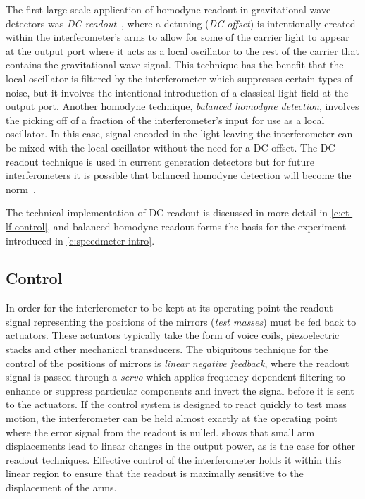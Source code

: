The first large scale application of homodyne readout in gravitational wave detectors was \emph{\gls{DC} readout}~\cite{Fricke2012}, where a detuning (\emph{\gls{DC} offset}) is intentionally created within the interferometer's arms to allow for some of the carrier light to appear at the output port where it acts as a local oscillator to the rest of the carrier that contains the gravitational wave signal. This technique has the benefit that the local oscillator is filtered by the interferometer which suppresses certain types of noise, but it involves the intentional introduction of a classical light field at the output port. Another homodyne technique, \emph{balanced homodyne detection}, involves the picking off of a fraction of the interferometer's input for use as a local oscillator. In this case, signal encoded in the light leaving the interferometer can be mixed with the local oscillator without the need for a \gls{DC} offset. The \gls{DC} readout technique is used in current generation detectors but for future interferometers it is possible that balanced homodyne detection will become the norm~\cite{Gard2016}.

The technical implementation of \gls{DC} readout is discussed in more detail in \cref{c:et-lf-control}, and balanced homodyne readout forms the basis for the experiment introduced in \cref{c:speedmeter-intro}.

\subsection{Control}
In order for the interferometer to be kept at its operating point the readout signal representing the positions of the mirrors (\emph{test masses}) must be fed back to actuators. These actuators typically take the form of voice coils, piezoelectric stacks and other mechanical transducers. The ubiquitous technique for the control of the positions of mirrors is \emph{linear negative feedback}, where the readout signal is passed through a \emph{servo} which applies frequency-dependent filtering to enhance or suppress particular components and invert the signal before it is sent to the actuators. If the control system is designed to react quickly to test mass motion, the interferometer can be held almost exactly at the operating point where the error signal from the readout is nulled.  shows that small arm displacements lead to linear changes in the output power, as is the case for other readout techniques. Effective control of the interferometer holds it within this linear region to ensure that the readout is maximally sensitive to the displacement of the arms.

